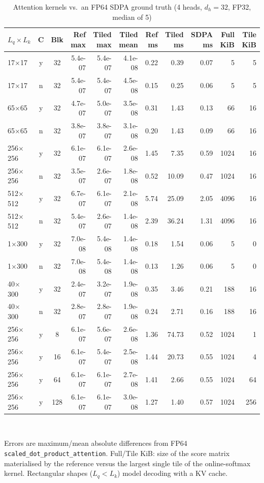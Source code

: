 \begin{table}[t]\centering\caption{Attention kernels vs.\ an FP64 SDPA ground truth (4 heads, $d_h=32$, FP32, median of 5)}\label{tab:attention}\footnotesize
\begin{tabular}{lccrrrrrrrr}
\hline
$L_q\times L_k$ & C & Blk & Ref max & Tiled max & Tiled mean & Ref ms & Tiled ms & SDPA ms & Full KiB & Tile KiB\\\hline
17$\times$17 & y & 32 & 5.4e-07 & 5.4e-07 & 4.1e-08 & 0.22 & 0.39 & 0.07 & 5 & 5\\
17$\times$17 & n & 32 & 5.4e-07 & 5.4e-07 & 4.5e-08 & 0.15 & 0.25 & 0.06 & 5 & 5\\
65$\times$65 & y & 32 & 4.7e-07 & 5.0e-07 & 3.5e-08 & 0.31 & 1.43 & 0.13 & 66 & 16\\
65$\times$65 & n & 32 & 3.8e-07 & 3.8e-07 & 3.1e-08 & 0.20 & 1.43 & 0.09 & 66 & 16\\
256$\times$256 & y & 32 & 6.1e-07 & 6.1e-07 & 2.6e-08 & 1.45 & 7.35 & 0.59 & 1024 & 16\\
256$\times$256 & n & 32 & 3.5e-07 & 2.6e-07 & 1.8e-08 & 0.52 & 10.09 & 0.47 & 1024 & 16\\
512$\times$512 & y & 32 & 6.7e-07 & 6.1e-07 & 2.1e-08 & 5.74 & 25.09 & 2.05 & 4096 & 16\\
512$\times$512 & n & 32 & 5.4e-07 & 2.6e-07 & 1.4e-08 & 2.39 & 36.24 & 1.31 & 4096 & 16\\
1$\times$300 & y & 32 & 7.0e-08 & 5.4e-08 & 1.4e-08 & 0.18 & 1.54 & 0.06 & 5 & 0\\
1$\times$300 & n & 32 & 7.0e-08 & 5.4e-08 & 1.4e-08 & 0.13 & 1.26 & 0.06 & 5 & 0\\
40$\times$300 & y & 32 & 2.4e-07 & 3.2e-07 & 1.9e-08 & 0.35 & 3.46 & 0.21 & 188 & 16\\
40$\times$300 & n & 32 & 2.8e-07 & 2.8e-07 & 1.9e-08 & 0.24 & 2.71 & 0.16 & 188 & 16\\
256$\times$256 & y & 8 & 6.1e-07 & 5.6e-07 & 2.6e-08 & 1.36 & 74.73 & 0.52 & 1024 & 1\\
256$\times$256 & y & 16 & 6.1e-07 & 5.4e-07 & 2.5e-08 & 1.44 & 20.73 & 0.55 & 1024 & 4\\
256$\times$256 & y & 64 & 6.1e-07 & 6.1e-07 & 2.7e-08 & 1.41 & 2.66 & 0.55 & 1024 & 64\\
256$\times$256 & y & 128 & 6.1e-07 & 6.1e-07 & 3.0e-08 & 1.27 & 1.40 & 0.57 & 1024 & 256\\
\hline\end{tabular}
\\[2pt]\parbox{0.95\linewidth}{\scriptsize Errors are maximum/mean absolute differences from FP64 \texttt{scaled\_dot\_product\_attention}. Full/Tile KiB: size of the score matrix materialised by the reference versus the largest single tile of the online-softmax kernel. Rectangular shapes ($L_q<L_k$) model decoding with a KV cache.}
\end{table}

